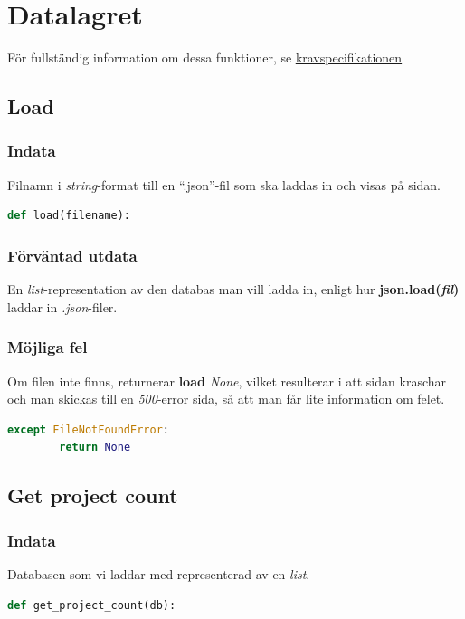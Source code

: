 \documentclass{TDP003mall}
\begin{document}
\section{Datalagret}
För fullständig information om dessa funktioner, se \uline{\href{https://www.ida.liu.se/~TDP003/current/portfolio-api_python3/}{kravspecifikationen}}
\subsection{Load}
\label{sec:load}
\subsubsection{Indata}
Filnamn i \textit{string}-format till en \enquote{.json}-fil som ska laddas in och visas på sidan.
\begin{lstlisting}[caption={Definering av \textbf{load()} funktionen}, language={Python}]
def load(filename):
\end{lstlisting}
\subsubsection{Förväntad utdata}
En \textit{list}-representation av den databas man vill ladda in, enligt hur \textbf{json.load(\textit{fil})} laddar in \textit{.json}-filer. 
\subsubsection{Möjliga fel}
Om filen inte finns, returnerar \textbf{load} \textit{None}, vilket resulterar i att sidan kraschar och man skickas till en \textit{500}-error sida, så att man får lite information om felet.
\begin{lstlisting}[caption={Hantering när den inte hittar filen}, language={Python}]
 except FileNotFoundError:
        return None
\end{lstlisting}

\subsection{Get project count}
\subsubsection{Indata}
Databasen som vi laddar med \uline{} representerad av en \textit{list}.
\begin{lstlisting}[caption={Definering av \textbf{get\_project\_count()} funktionen.}, language=Python]
def get_project_count(db):
\end{lstlisting}
\end{document}
